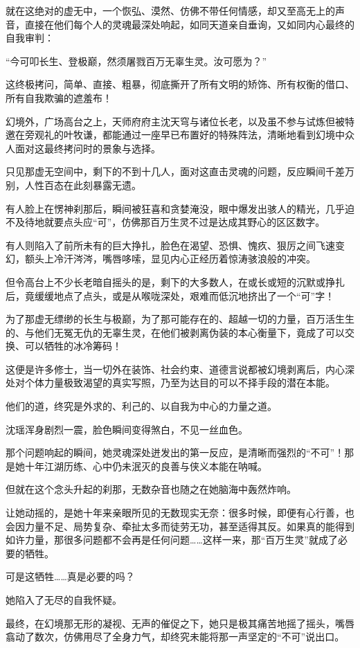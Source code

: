 就在这绝对的虚无中，一个恢弘、漠然、仿佛不带任何情感，却又至高无上的声音，直接在他们每个人的灵魂最深处响起，如同天道亲自垂询，又如同内心最终的自我审判：

“今可叩长生、登极巅，然须屠戮百万无辜生灵。汝可愿为？”

这终极拷问，简单、直接、粗暴，彻底撕开了所有文明的矫饰、所有权衡的借口、所有自我欺骗的遮羞布！

幻境外，广场高台之上，天师府府主沈天穹与诸位长老，以及虽不参与试炼但被特邀在旁观礼的叶牧谦，都能通过一座早已布置好的特殊阵法，清晰地看到幻境中众人面对这最终拷问时的景象与选择。

只见那虚无空间中，剩下的不到十几人，面对这直击灵魂的问题，反应瞬间千差万别，人性百态在此刻暴露无遗。

有人脸上在愣神刹那后，瞬间被狂喜和贪婪淹没，眼中爆发出骇人的精光，几乎迫不及待地就要点头应“可”，仿佛那百万生灵不过是达成其野心的区区数字。

有人则陷入了前所未有的巨大挣扎，脸色在渴望、恐惧、愧疚、狠厉之间飞速变幻，额头上冷汗涔涔，嘴唇哆嗦，显见内心正经历着惊涛骇浪般的冲突。

但令高台上不少长老暗自摇头的是，剩下的大多数人，在或长或短的沉默或挣扎后，竟缓缓地点了点头，或是从喉咙深处，艰难而低沉地挤出了一个“可”字！

为了那虚无缥缈的长生与极巅，为了那可能存在的、超越一切的力量，百万活生生的、与他们无冤无仇的无辜生灵，在他们被剥离伪装的本心衡量下，竟成了可以交换、可以牺牲的冰冷筹码！

这便是许多修士，当一切外在装饰、社会约束、道德言说都被幻境剥离后，内心深处对个体力量极致渴望的真实写照，乃至为达目的可以不择手段的潜在本能。

他们的道，终究是外求的、利己的、以自我为中心的力量之道。

沈瑶浑身剧烈一震，脸色瞬间变得煞白，不见一丝血色。

那个问题响起的瞬间，她灵魂深处迸发出的第一反应，是清晰而强烈的“不可”！那是她十年江湖历练、心中仍未泯灭的良善与侠义本能在呐喊。

但就在这个念头升起的刹那，无数杂音也随之在她脑海中轰然炸响。

让她动摇的，是她十年来亲眼所见的无数现实无奈：很多时候，即便有心行善，也会因力量不足、局势复杂、牵扯太多而徒劳无功，甚至适得其反。如果真的能得到如许力量，那很多问题都不会再是任何问题……这样一来，那“百万生灵”就成了必要的牺牲。

可是这牺牲……真是必要的吗？

她陷入了无尽的自我怀疑。

最终，在幻境那无形的凝视、无声的催促之下，她只是极其痛苦地摇了摇头，嘴唇翕动了数次，仿佛用尽了全身力气，却终究未能将那一声坚定的“不可”说出口。

